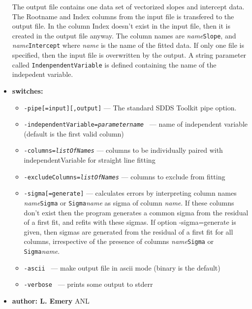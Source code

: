 \begin{itemize}
The output file contains one data set of vectorized slopes and intercept data.
The Rootname and Index columns from the input file is transfered to the output file.
In the column Index doesn't exist in the input file, then it is created in the output
file anyway.
The column names are {\em name}\verb|Slope|, and {\em name}\verb|Intercept| 
where {\em name} is the name of the fitted data.
If only one file is specified, then the input file is overwritten by the output.
A string parameter called \verb|IndenpendentVariable| is defined containing the name of the indepedent variable.

\item {\bf switches:}
%
%
    \begin{itemize}
%
%
    \item {\tt  -pipe[=input][,output]} --- The standard SDDS Toolkit pipe option.
    \item {\tt  -independentVariable={\em parametername} }
        --- name of independent variable (default is the first valid column)
    \item {\tt  -columns={\em listOfNames}}   
        ---  columns to be individually paired with independentVariable for straight line fitting
    \item {\tt  -excludeColumns={\em listOfNames}}  ---    columns to exclude from fitting
    \item {\tt  -sigma[=generate]}  
        ---   calculates errors by interpreting column names 
        {\em name}\verb|Sigma| or \verb|Sigma|{\em name} as
        sigma of column {\em name}. If these columns don't exist
        then the program generates a common sigma from the residual of a first fit,
        and refits with these sigmas. If option -sigma=generate is given,
        then sigmas are generated from the residual of a first fit for all columns,
        irrespective of the presence of columns {\em name}\verb|Sigma| or \verb|Sigma|{\em name}.
    \item {\tt  -ascii }    ---         make output file in ascii mode (binary is the default)
    \item {\tt  -verbose }  ---         prints some output to stderr

    \end{itemize}
%
%
%
%
\item {\bf author: L. Emery } ANL
\end{itemize}


